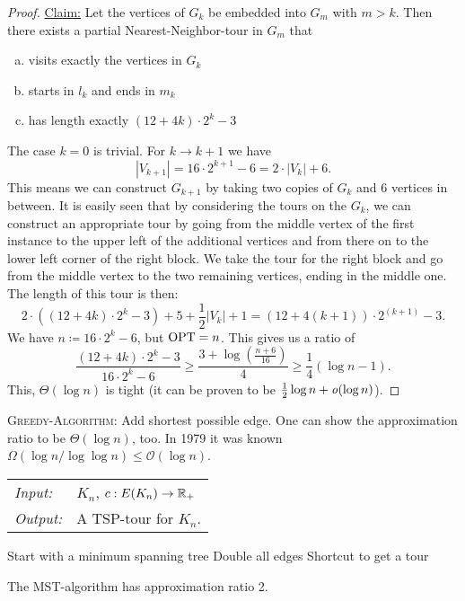 \documentclass[../skript.tex]{subfiles}
\begin{document}
\begin{proof}
\underline{Claim:} Let the vertices of $G_k$ be embedded into $G_m$ with $m > k$. Then there exists a partial Nearest-Neighbor-tour in $G_m$ that
\begin{enumerate}[(a)]
\item visits exactly the vertices in $G_k$
\item starts in $l_k$ and ends in $m_k$
\item has length exactly $(12 + 4k) \cdot 2^k - 3$
\end{enumerate}
The case $k = 0$ is trivial. For $k \to k + 1$ we have
\[
	|V_{k+1}| = 16 \cdot 2^{k+1} - 6 = 2 \cdot |V_k| + 6.
\]
This means we can construct $G_{k+1}$ by taking two copies of $G_k$ and 6 vertices in between. It is easily seen that by considering the tours on the $G_k$, we can construct an appropriate tour by going from the middle vertex of the first instance to the upper left of the additional vertices and from there on to the lower left corner of the right block. We take the tour for the right block and go from the middle vertex to the two remaining vertices, ending in the middle one.
The length of this tour is then:
\[
	2 \cdot \left( (12 + 4k) \cdot 2^k - 3 \right) + 5 + \frac{1}{2} |V_k| + 1 = (12 + 4{(k+1)}) \cdot 2^{(k+1)} - 3.
\]
We have $n \coloneqq 16 \cdot 2^k - 6$, but $\operatorname{OPT} = n$. This gives us a ratio of
\[
	\frac{(12 + 4k) \cdot 2^k -3}{16 \cdot 2^k - 6} \geq \frac{3 + \log \left( \frac{n+6}{16} \right)}{4} \geq \frac{1}{4} \left( \log n - 1 \right).
\]
This, $\Theta(\log n)$ is tight (it can be proven to be $\frac{1}{2} \log n + \mathit{o}(\log n)$).
\end{proof}
\begin{remark}
\textsc{Greedy-Algorithm:} Add shortest possible edge. One can show the approximation ratio to be $\Theta(\log n)$, too. In 1979 it was known $\Omega(\log n/\log \log n) \leq \mathcal{O}(\log n)$.
\end{remark}
\begin{samepage}
\begin{algorithmbox}
\begin{tabular}{@{}ll}
\textit{Input:} & $K_n$, $c : E(K_n) \to \mathbb{R}_+$\\
\textit{Output:} & A TSP-tour for $K_n$.
\end{tabular}
\end{algorithmbox}
\vspace{-7pt}
\begin{algorithm}[H]
Start with a minimum spanning tree\;
Double all edges\;
Shortcut to get a tour\;
\end{algorithm}
\vspace{-7pt}
\EndAlgorithmLine
\end{samepage}
\begin{theorem} %
\label{thm:87}
The MST-algorithm has approximation ratio 2.
\end{theorem}
\end{document}
